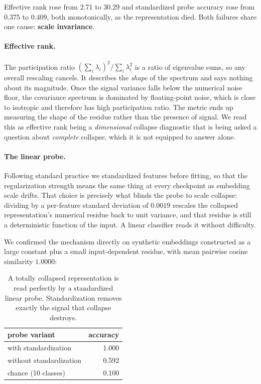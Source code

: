 Effective rank rose from 2.71 to 30.29 and standardized probe accuracy rose from 0.375 to
0.409, both monotonically, as the representation died. \ours{} Both failures share one
cause: \textbf{scale invariance}.

\paragraph{Effective rank.} The participation ratio
$(\sum_i \lambda_i)^2 / \sum_i \lambda_i^2$ is a ratio of eigenvalue sums, so any overall
rescaling cancels. It describes the \emph{shape} of the spectrum and says nothing about
its magnitude. Once the signal variance falls below the numerical noise floor, the
covariance spectrum is dominated by floating-point noise, which is close to isotropic and
therefore has high participation ratio. The metric ends up measuring the shape of the
residue rather than the presence of signal. \interp{} We read this as effective rank being
a \emph{dimensional} collapse diagnostic that is being asked a question about
\emph{complete} collapse, which it is not equipped to answer alone.

\paragraph{The linear probe.} Following standard practice we standardized features before
fitting, so that the regularization strength means the same thing at every checkpoint as
embedding scale drifts. That choice is precisely what blinds the probe to scale collapse:
dividing by a per-feature standard deviation of $0.0019$ rescales the collapsed
representation's numerical residue back to unit variance, and that residue is still a
deterministic function of the input. A linear classifier reads it without difficulty.

We confirmed the mechanism directly on synthetic embeddings constructed as a large
constant plus a small input-dependent residue, with mean pairwise cosine similarity
$1.0000$:

\begin{table}[h]
\centering
\small
\begin{tabular}{l r}
\toprule
\textbf{probe variant} & \textbf{accuracy} \\
\midrule
with standardization & 1.000 \\
without standardization & 0.592 \\
chance (10 classes) & 0.100 \\
\bottomrule
\end{tabular}
\caption{\ours{} A totally collapsed representation is read perfectly by a standardized
linear probe. Standardization removes exactly the signal that collapse destroys.}
\end{table}

